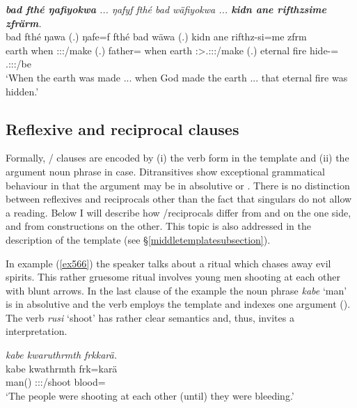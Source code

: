 \begin{exe}
	\ex \emph{\textbf{bad fthé ŋafiyokwa} ... ŋafyf fthé bad wäfiyokwa ... \textbf{kidn ane rifthzsime zfrärm}.}\\
	\gll bad fthé ŋawa (.) ŋafe=f fthé bad wäwa (.) kidn ane rifthz-si=me zfrm\\
	earth when \Sg:\Sbj:\Pst:\Ipfv/make (.) father=\Erg{} when earth \Stsg:\Sbj>\Tsg.\F:\Obj:\Pst:\Ipfv/make (.) {eternal fire} \Dem{} hide-\Nmlz=\Ins{} \Tsg.\F:\Sbj:\Pst:\Dur/be\\
	\trans `When the earth was made ... when God made the earth ... that eternal fire was hidden.'
	\label{ex554}
\end{exe}

\subsection{Reflexive and reciprocal clauses}\label{reflrecipclause}

Formally, / clauses are encoded by (i) the verb form in the  template and (ii) the argument noun phrase in  case. Ditransitives show exceptional grammatical behaviour in that the argument may be in absolutive or  . There is no distinction between reflexives and reciprocals other than the fact that singulars do not allow a  reading. Below I will describe how /reciprocals differ from  and   on the one side, and from  constructions on the other. This topic is also addressed in the description of the  template (see \S{}\ref{middletemplatesubsection}).%

In example (\ref{ex566}) the speaker talks about a ritual which chases away evil spirits. This rather gruesome ritual involves young men shooting at each other with blunt arrows. In the last clause of the example the noun phrase \emph{kabe} `man' is in absolutive  and the verb employs the  template and indexes one argument (\Stpl). The verb \emph{rusi} `shoot' has rather clear  semantics and, thus, invites a  interpretation.

\begin{exe}
	\ex \emph{kabe kwaruthrmth frkkarä.}\\
	\gll kabe kwathrmth frk=karä\\
	man(\Abs) \Stpl:\Sbj:\Pst:\Dur/shoot blood=\Prop\\
	\trans `The people were shooting at each other (until) they were bleeding.'
	\label{ex566}
\end{exe}

